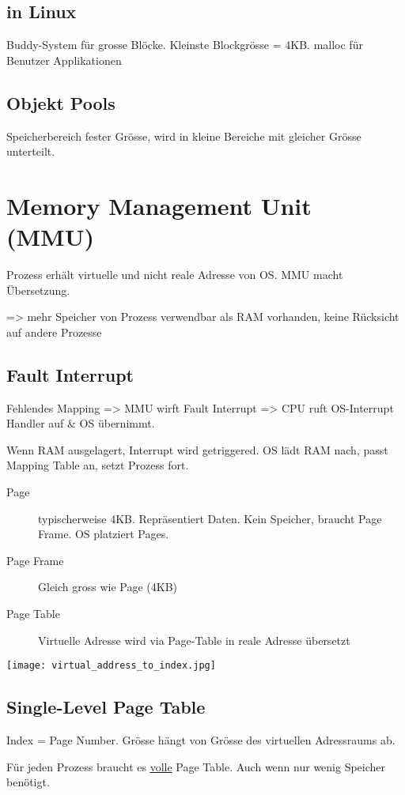 \begin{multicols*}{4}
\subsection{in Linux}
Buddy-System für grosse Blöcke. Kleinste Blockgrösse = 4KB. malloc für Benutzer Applikationen

\subsection{Objekt Pools}
Speicherbereich fester Grösse, wird in kleine Bereiche mit gleicher Grösse unterteilt.

\section{Memory Management Unit (MMU)}
Prozess erhält virtuelle und nicht reale Adresse von OS. MMU macht Übersetzung.

=> mehr Speicher von Prozess verwendbar als RAM vorhanden, keine Rücksicht auf andere Prozesse

\subsection{Fault Interrupt}
Fehlendes Mapping => MMU wirft Fault Interrupt => CPU ruft OS-Interrupt Handler auf \& OS übernimmt.\vspace{2pt}

Wenn RAM ausgelagert, Interrupt wird getriggered. OS lädt RAM nach, passt Mapping Table an, setzt Prozess fort.

\begin{description}
    \item[Page] typischerweise 4KB. Repräsentiert Daten. Kein Speicher, braucht Page Frame. OS platziert Pages.
    \item[Page Frame] Gleich gross wie Page (4KB)
    \item[Page Table] Virtuelle Adresse wird via Page-Table in reale Adresse übersetzt
\end{description}

\texttt{[image: virtual\_address\_to\_index.jpg]}

\subsection{Single-Level Page Table}
Index = Page Number. Grösse hängt von Grösse des virtuellen Adressraums ab.

Für jeden Prozess braucht es \underline{volle} Page Table. Auch wenn nur wenig Speicher benötigt.


\end{multicols*}
